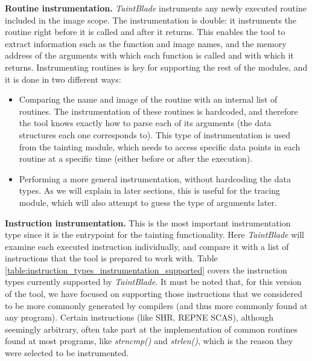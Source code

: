 \documentclass[conference]{IEEEtran}
\begin{document}
\textbf{Routine instrumentation.}
\textit{TaintBlade} instruments any newly executed routine included in the image scope. The instrumentation is double: it instruments
the routine right before it is called and after it returns. This enables
the tool to extract information such as the function and image names, and the memory address of the arguments with which each
function is called and with which it returns. Instrumenting routines is key for supporting the rest of the modules, and it is done in two different ways:

\begin{itemize}
    \item Comparing the name and image of the routine with an internal list of routines.
          The instrumentation of these routines is hardcoded, and therefore the tool
          knows exactly how to parse each of its arguments (the data structures each one
          corresponds to). This type of instrumentation is used from the tainting module,
          which needs to access specific data points in each routine at a specific time
          (either before or after the execution).
    \item Performing a more general instrumentation, without hardcoding the data types.
          As we will explain in later sections, this is useful for the tracing module,
          which will also attempt to guess the type of arguments later.
\end{itemize}

\textbf{Instruction instrumentation.}
This is the most important instrumentation type since it is the entrypoint for the tainting functionality.
Here \textit{TaintBlade} will examine each executed instruction individually, and
compare it with a list of instructions that the tool is prepared to work with. Table \ref{table:instruction_types_instrumentation_supported}
covers the instruction types currently supported by \textit{TaintBlade}. It must be noted that, for this version of the tool, we have focused
on supporting those instructions that we considered to be more commonly generated by compilers (and thus
more commonly found at any program). Certain instructions (like SHR, REPNE SCAS), although seemingly arbitrary,
often take part at the implementation of common routines found at most programs, like \textit{strncmp()} and \textit{strlen()},
which is the reason they were selected to be instrumented.
\end{document}
